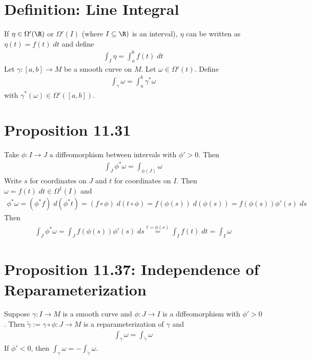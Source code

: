 \documentclass[11pt]{article}
\begin{document}
\section*{Definition: Line Integral}
\label{sec:org032c389}
If \(\eta\in\Omega'(\R)\) or \(\Omega'(I)\) (where \(I\subseteq\R)\) is an interval), \(\eta\) can be written as \(\eta(t)=f(t)\;dt\) and define\\
\begin{align*}
  \int_{I}\eta=\int_{a}^{b}f(t)\;dt
\end{align*}
Let \(\gamma:[a,b]\to M\) be a smooth curve on \(M\). Let \(\omega\in\Omega'(t)\). Define\\
\begin{align*}
  \int_{\gamma}\omega
  =\int_{a}^{b}\gamma^{*}\omega
\end{align*}
with \(\gamma^{*}(\omega)\in\Omega'([a,b])\).\\
\section*{Proposition 11.31}
\label{sec:org07e9fbb}
Take \(\phi:I\to J\) a diffeomorphism between intervals with \(\phi'>0\). Then\\
\begin{align*}
  \int_{J}\phi^{*}\omega=\int_{\phi(J)}\omega
\end{align*}
Write \(s\) for coordinates on \(J\) and \(t\) for coordinates on \(I\). Then \(\omega=f(t)\;dt\in\Omega^{1}(I)\) and\\
\begin{align*}
  \phi^{*}\omega
  =(\phi^{*}f)\;d(\phi^{*}t)
  =(f\circ\phi)\;d(t\circ\phi)
  =f(\phi(s))\;d(\phi(s))
  =f(\phi(s))\phi'(s)\;ds
\end{align*}
Then\\
\begin{align*}
  \int_{J}\phi^{*}\omega
  =\int_{J}f(\phi(s))\phi'(s)\;ds
  \overset{t=\phi(s)}{=}\int_{I}f(t)\;dt
  =\int_{I}\omega
\end{align*}
\section*{Proposition 11.37: Independence of Reparameterization}
\label{sec:org0e075c3}
Suppose \(\gamma:I\to M\) is a smooth curve and \(\phi:J\to I\) is a diffeomorphism with \(\phi'>0\). Then \(\tilde{\gamma}:=\gamma\circ\phi:J\to M\) is a reparameterization of \(\gamma\) and\\
\begin{align*}
  \int_{\gamma}\omega=\int_{\tilde{\gamma}}\omega
\end{align*}
If \(\phi'<0\), then \(\int_{\gamma}\omega=-\int_{\tilde{\gamma}}\omega\).\\
\end{document}
